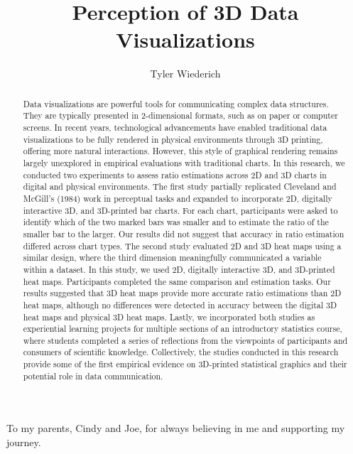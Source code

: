 \documentclass[phd]{nuthesis}
\title{Perception of 3D Data Visualizations}
\author{Tyler Wiederich}
\begin{document}
\maketitle

\begin{abstract}
Data visualizations are powerful tools for communicating complex data
structures. They are typically presented in 2-dimensional formats, such
as on paper or computer screens. In recent years, technological
advancements have enabled traditional data visualizations to be fully
rendered in physical environments through 3D printing, offering more
natural interactions. However, this style of graphical rendering remains
largely unexplored in empirical evaluations with traditional charts. In
this research, we conducted two experiments to assess ratio estimations
across 2D and 3D charts in digital and physical environments. The first
study partially replicated Cleveland and McGill's (1984) work in
perceptual tasks and expanded to incorporate 2D, digitally interactive
3D, and 3D-printed bar charts. For each chart, participants were asked
to identify which of the two marked bars was smaller and to estimate the
ratio of the smaller bar to the larger. Our results did not suggest that
accuracy in ratio estimation differed across chart types. The second
study evaluated 2D and 3D heat maps using a similar design, where the
third dimension meaningfully communicated a variable within a dataset.
In this study, we used 2D, digitally interactive 3D, and 3D-printed heat
maps. Participants completed the same comparison and estimation tasks.
Our results suggested that 3D heat maps provide more accurate ratio
estimations than 2D heat maps, although no differences were detected in
accuracy between the digital 3D heat maps and physical 3D heat maps.
Lastly, we incorporated both studies as experiential learning projects
for multiple sections of an introductory statistics course, where
students completed a series of reflections from the viewpoints of
participants and consumers of scientific knowledge. Collectively, the
studies conducted in this research provide some of the first empirical
evidence on 3D-printed statistical graphics and their potential role in
data communication.
\end{abstract}

\begin{copyrightpage}

\end{copyrightpage}

\begin{dedication}
To my parents, Cindy and Joe, for always believing in me and supporting
my journey.
\end{dedication}
\end{document}

